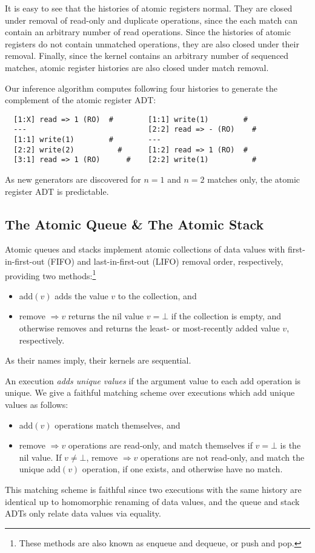 It is easy to see that the histories of atomic registers normal. They are
closed under removal of read-only and duplicate operations, since the each
match can contain an arbitrary number of read operations. Since the histories
of atomic registers do not contain unmatched operations, they are also closed
under their removal. Finally, since the kernel contains an arbitrary number of
sequenced matches, atomic register histories are also closed under match
removal.

Our inference algorithm computes following four histories to generate the
complement of the atomic register ADT:
\begin{verbatim}
  [1:X] read => 1 (RO)  #        [1:1] write(1)        #
  ---                            [2:2] read => - (RO)    #
  [1:1] write(1)        #        ---
  [2:2] write(2)          #      [1:2] read => 1 (RO)  #
  [3:1] read => 1 (RO)      #    [2:2] write(1)          #
\end{verbatim}
As new generators are discovered for $n=1$ and $n=2$ matches only, the atomic
register ADT is predictable.

\subsection{The Atomic Queue \& The Atomic Stack}

Atomic queues and stacks implement atomic collections of data values with
first-in-first-out (FIFO) and last-in-first-out (LIFO) removal order,
respectively, providing two methods:\footnote{These methods are also known as
enqueue and dequeue, or push and pop.}
\begin{itemize}

  \item add$(v)$ adds the value $v$ to the collection, and

  \item remove $\Rightarrow v$ returns the nil value $v = \mathord\perp$ if the
  collection is empty, and otherwise removes and returns the least- or
  most-recently added value $v$, respectively.

\end{itemize}
As their names imply, their kernels are sequential.

An execution \emph{adds unique values} if the argument value to each add
operation is unique. We give a faithful matching scheme over executions which
add unique values as follows:
\begin{itemize}

  \item add$(v)$ operations match themselves, and

  \item remove $\Rightarrow v$ operations are read-only, and match themselves
  if $v = \mathord\perp$ is the nil value. If $v \neq \mathord\perp$, remove
  $\Rightarrow v$ operations are not read-only, and match the unique add$(v)$
  operation, if one exists, and otherwise have no match.

\end{itemize}
This matching scheme is faithful since two executions with the same history are
identical up to homomorphic renaming of data values, and the queue and stack
ADTs only relate data values via equality.

